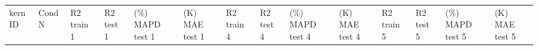 \documentclass[journal=jacsat,manuscript=article]{achemso}
\begin{document}
\begin{table}[H]
    \centering
    \begin{tabular}{>{\centering\arraybackslash}p{1.0cm}>{\centering\arraybackslash}p{1.25cm}>{\centering\arraybackslash}p{0.75cm}>{\centering\arraybackslash}p{0.75cm}>{\centering\arraybackslash}p{1.0cm}>{\centering\arraybackslash}p{1.0cm}>{\centering\arraybackslash}p{0.75cm}>{\centering\arraybackslash}p{0.75cm}>{\centering\arraybackslash}p{1cm}>{\centering\arraybackslash}p{0.75cm}>{\centering\arraybackslash}p{0.75cm}>{\centering\arraybackslash}p{0.75cm}>{\centering\arraybackslash}p{1cm}>{\centering\arraybackslash}p{0.75cm}}
    \vspace{1.15cm}  kern ID& 
    \vspace{1.15cm} Cond   N& 
    \vspace{0.66cm} R2  train     1&  
    \vspace{0.66cm} R2  test   1& 
    \vspace{0.146cm} (\%) MAPD test \hspace{0.5cm}  1&  
 \vspace{0.146cm} (K) MAE test  \hspace{0.5cm}   1&  \vspace{0.66cm} R2 train   4& \vspace{0.66cm} R2 test   4& \vspace{0.146cm} (\%) MAPD test  \hspace{0.5cm}  4&
 \vspace{0.146cm} (K) MAE test  \hspace{0.5cm}   4&
 \vspace{0.66cm} R2   train      5&
 \vspace{0.66cm} R2   test     5&
 \vspace{0.146cm} (\%) MAPD test  \hspace{0.5cm}   5&
 \vspace{0.146cm} (K) MAE test  \hspace{0.5cm}   5
 


\end{tabular}
\end{table}
\end{document}
